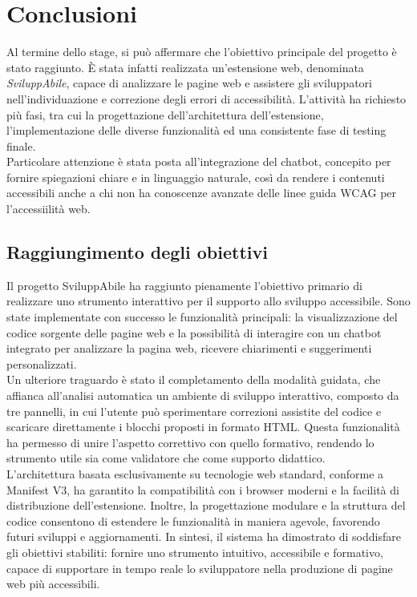 \chapter{Conclusioni}
\label{chap:conclusioni}
\noindent Al termine dello stage, si può affermare che l’obiettivo principale del progetto è stato raggiunto. È stata infatti realizzata un’estensione web, denominata \textit{SviluppAbile}, capace di analizzare le pagine web e assistere gli sviluppatori nell’individuazione e correzione degli errori di accessibilità. L’attività ha richiesto più fasi, tra cui la progettazione dell’architettura dell’estensione, l’implementazione delle diverse funzionalità ed una consistente fase di testing finale. \\Particolare attenzione è stata posta all’integrazione del chatbot, concepito per fornire spiegazioni chiare e in linguaggio naturale, così da rendere i contenuti accessibili anche a chi non ha conoscenze avanzate delle linee guida WCAG per l'accessiilità web.

\section{Raggiungimento degli obiettivi}
\noindent Il progetto SviluppAbile ha raggiunto pienamente l’obiettivo primario di realizzare uno strumento interattivo per il supporto allo sviluppo accessibile. Sono state implementate con successo le funzionalità principali: la visualizzazione del codice sorgente delle pagine web e la possibilità di interagire con un chatbot integrato per analizzare la pagina web, ricevere chiarimenti e suggerimenti personalizzati.\\
Un ulteriore traguardo è stato il completamento della modalità guidata, che affianca all’analisi automatica un ambiente di sviluppo interattivo, composto da tre pannelli, in cui l’utente può sperimentare correzioni assistite del codice e scaricare direttamente i blocchi proposti in formato HTML. Questa funzionalità ha permesso di unire l’aspetto correttivo con quello formativo, rendendo lo strumento utile sia come validatore che come supporto didattico.\\
L’architettura basata esclusivamente su tecnologie web standard, conforme a Manifest V3, ha garantito la compatibilità con i browser moderni e la facilità di distribuzione dell’estensione. Inoltre, la progettazione modulare e la struttura del codice consentono di estendere le funzionalità in maniera agevole, favorendo futuri sviluppi e aggiornamenti.
In sintesi, il sistema ha dimostrato di soddisfare gli obiettivi stabiliti: fornire uno strumento intuitivo, accessibile e formativo, capace di supportare in tempo reale lo sviluppatore nella produzione di pagine web più accessibili.


